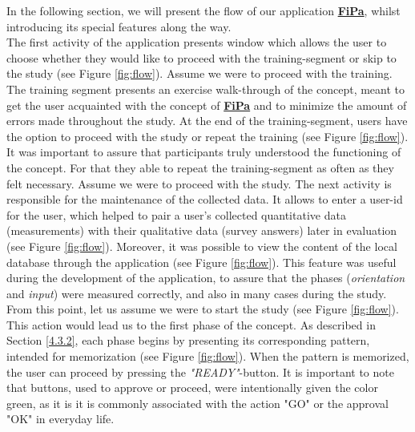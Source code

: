 In the following section, we will present the flow of our application \underline{\textbf{FiPa}}, whilst introducing its special features along the way. \\

The first activity of the application presents window which allows the user to choose whether they would like to proceed with the training-segment or skip to the study (see Figure \ref{fig:flow}). Assume we were to proceed with the training. The training segment presents an exercise walk-through of the concept, meant to get the user acquainted with the concept of \underline{\textbf{FiPa}} and to minimize the amount of errors made throughout the study. At the end of the training-segment, users have the option to proceed with the study or repeat the training (see Figure \ref{fig:flow}). It was important to assure that participants truly understood the functioning of the concept. For that they able to repeat the training-segment as often as they felt necessary. Assume we were to proceed with the study. The next activity is responsible for the maintenance of the collected data. It allows to enter a user-id for the user, which helped to pair a user's collected quantitative data (measurements) with their qualitative data (survey answers) later in evaluation (see Figure \ref{fig:flow}). Moreover, it was possible to view the content of the local database through the application (see Figure \ref{fig:flow}). This feature was useful during the development of the application, to assure that the phases (\textit{orientation} and \textit{input}) were measured correctly, and also in many cases during the study. From this point, let us assume we were to start the study (see Figure \ref{fig:flow}). This action would lead us to the first phase of the concept. As described in Section \ref{4.3.2}, each phase begins by presenting its corresponding pattern, intended for memorization (see Figure \ref{fig:flow}). When the pattern is memorized, the user can proceed by pressing the \textit{"READY"}-button. It is important to note that buttons, used to approve or proceed, were intentionally given the color green, as it is it is commonly associated with the action "GO" or the approval "OK" in everyday life.\\

